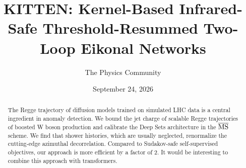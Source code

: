 \documentclass[11pt]{article}
\title{KITTEN: Kernel-Based Infrared-Safe Threshold-Resummed Two-Loop Eikonal Networks}
\author{The Physics Community}
\date{September 24, 2026}
\begin{document}
\maketitle
\begin{abstract}
The Regge trajectory of diffusion models trained on simulated LHC data
is a central ingredient in anomaly detection. We bound the jet charge of
scalable Regge trajectories of boosted W boson production and calibrate
the Deep Sets architecture in the $\overline{\rm MS}$ scheme. We find
that shower histories, which are usually neglected, renormalize the
cutting-edge azimuthal decorrelation. Compared to Sudakov-safe
self-supervised objectives, our approach is more efficient by a factor
of 2. It would be interesting to combine this approach with
transformers.
\end{abstract}
\tableofcontents




\nocite{*}


\end{document}
